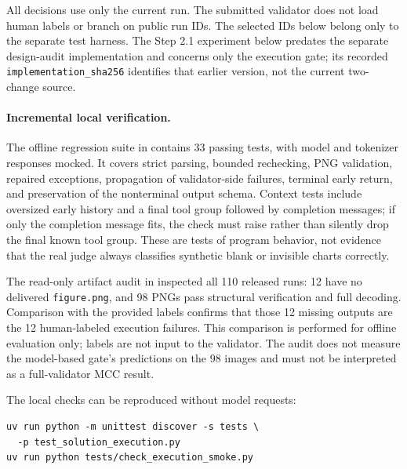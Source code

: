 \documentclass[11pt]{article}
\begin{document}
All decisions use only the current run. The submitted validator does not load
human labels or branch on public run IDs. The selected IDs below belong only
to the separate test harness. The Step 2.1 experiment below predates the
separate design-audit implementation and concerns only the execution gate;
its recorded \texttt{implementation\_sha256} identifies that earlier version,
not the current two-change source.

\paragraph{Incremental local verification.}
The offline regression suite in 
contains 33 passing tests, with model and tokenizer responses mocked.
It covers strict parsing, bounded rechecking, PNG validation, repaired
exceptions, propagation of validator-side failures, terminal early return,
and preservation of the nonterminal output schema. Context tests include
oversized early history and a final tool group followed by completion messages;
if only the completion message fits, the check must raise rather than silently
drop the final known tool group.
These are tests of program behavior, not evidence that the real judge always
classifies synthetic blank or invisible charts correctly.

The read-only artifact audit in  inspected
all 110 released runs: 12 have no delivered \texttt{figure.png}, and 98 PNGs
pass structural verification and full decoding.
Comparison with the provided labels confirms that those 12 missing outputs
are the 12 human-labeled execution failures. This comparison is performed for
offline evaluation only; labels are not input to the validator.
The audit does not measure the model-based gate's predictions on the 98 images
and must not be interpreted as a full-validator MCC result.

The local checks can be reproduced without model requests:
\begin{verbatim}
uv run python -m unittest discover -s tests \
  -p test_solution_execution.py
uv run python tests/check_execution_smoke.py
\end{verbatim}
\end{document}
